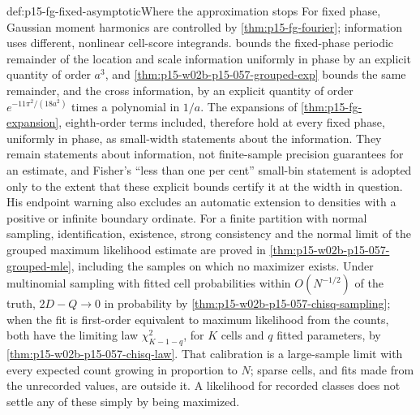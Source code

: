 \begin{proofboundary}{def:p15-fg-fixed-asymptotic}{Where the approximation stops}
For fixed phase, Gaussian moment harmonics are controlled by
\cref{thm:p15-fg-fourier}; information uses different, nonlinear cell-score
integrands.  bounds the
fixed-phase periodic remainder of the location and scale information
uniformly in phase by an explicit quantity of order \(a^3\), and
\cref{thm:p15-w02b-p15-057-grouped-exp} bounds the same remainder, and the
cross information, by an explicit quantity of order
\(e^{-11\pi^2/(18a^2)}\) times a polynomial in \(1/a\). The expansions of
\cref{thm:p15-fg-expansion}, eighth-order terms included, therefore hold at
every fixed phase, uniformly in phase, as small-width statements about the
information. They remain statements about information, not finite-sample
precision guarantees for an estimate, and Fisher's ``less than one per
cent'' small-bin statement is adopted only to the extent that these
explicit bounds certify it at the width in question.
His endpoint warning also excludes an automatic extension to densities
with a positive or infinite boundary ordinate. For a finite partition with
normal sampling, identification, existence, strong consistency and the
normal limit of the grouped maximum likelihood estimate are proved in
\cref{thm:p15-w02b-p15-057-grouped-mle}, including the samples on which no
maximizer exists. Under multinomial sampling with fitted cell
probabilities within \(O(N^{-1/2})\) of the truth, \(2D-Q\to0\) in
probability by \cref{thm:p15-w02b-p15-057-chisq-sampling}; when the fit is
first-order equivalent to maximum likelihood from the counts, both have the
limiting law \(\chi^2_{K-1-q}\), for \(K\) cells and \(q\) fitted
parameters, by \cref{thm:p15-w02b-p15-057-chisq-law}.
That calibration is a large-sample limit with every expected count growing
in proportion to \(N\); sparse cells, and fits made from the unrecorded
values, are outside it. A likelihood for
recorded classes does not settle any of these simply by being maximized.
\end{proofboundary}
